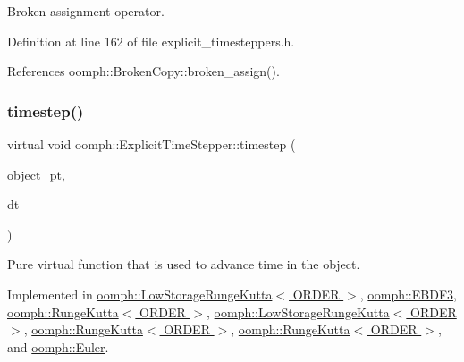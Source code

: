 Broken assignment operator. 



Definition at line 162 of file explicit\+\_\+timesteppers.\+h.



References oomph\+::\+Broken\+Copy\+::broken\+\_\+assign().

\mbox{\label{classoomph_1_1ExplicitTimeStepper_ab43bbab17960d0f50b8842e996f5c765}} 
\subsubsection{\texorpdfstring{timestep()}{timestep()}}
{\footnotesize\ttfamily virtual void oomph\+::\+Explicit\+Time\+Stepper\+::timestep (\begin{DoxyParamCaption}\item[{\hyperlink{classoomph_1_1ExplicitTimeSteppableObject}{Explicit\+Time\+Steppable\+Object} $\ast$const \&}]{object\+\_\+pt,  }\item[{const double \&}]{dt }\end{DoxyParamCaption})\hspace{0.3cm}{\ttfamily [pure virtual]}}



Pure virtual function that is used to advance time in the object. 



Implemented in \hyperlink{classoomph_1_1LowStorageRungeKutta_ab2bcb2ad33cec657fd113debc8c4705b}{oomph\+::\+Low\+Storage\+Runge\+Kutta$<$ O\+R\+D\+E\+R $>$}, \hyperlink{classoomph_1_1EBDF3_a273b7eaa19d2e95d6392e6d8dc2970d9}{oomph\+::\+E\+B\+D\+F3}, \hyperlink{classoomph_1_1RungeKutta_a41922b5bf83c9a719106cbb7b862ee51}{oomph\+::\+Runge\+Kutta$<$ O\+R\+D\+E\+R $>$}, \hyperlink{classoomph_1_1LowStorageRungeKutta_afc3d30c130b3a6ab111a89f0b0f884d6}{oomph\+::\+Low\+Storage\+Runge\+Kutta$<$ O\+R\+D\+E\+R $>$}, \hyperlink{classoomph_1_1RungeKutta_a53a492b4190ccd3dfc0b4af35b2c240f}{oomph\+::\+Runge\+Kutta$<$ O\+R\+D\+E\+R $>$}, \hyperlink{classoomph_1_1RungeKutta_a506750a0c4fe555f434dadf139ad4f07}{oomph\+::\+Runge\+Kutta$<$ O\+R\+D\+E\+R $>$}, and \hyperlink{classoomph_1_1Euler_adeea8e3567a50fb3873fab05a7ca928a}{oomph\+::\+Euler}.



